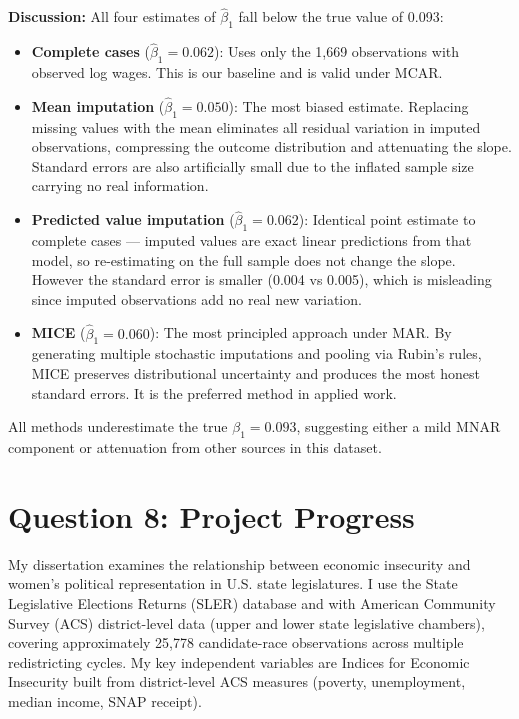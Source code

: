 \documentclass[12pt]{article}
\begin{document}
\noindent\textbf{Discussion:} All four estimates of $\hat{\beta}_1$ fall below the true value of 0.093:

\begin{itemize}
  \item \textbf{Complete cases} ($\hat{\beta}_1 = 0.062$): Uses only the 1,669 observations with observed log wages. This is our baseline and is valid under MCAR.
  \item \textbf{Mean imputation} ($\hat{\beta}_1 = 0.050$): The most biased estimate. Replacing missing values with the mean eliminates all residual variation in imputed observations, compressing the outcome distribution and attenuating the slope. Standard errors are also artificially small due to the inflated sample size carrying no real information.
  \item \textbf{Predicted value imputation} ($\hat{\beta}_1 = 0.062$): Identical point estimate to complete cases --- imputed values are exact linear predictions from that model, so re-estimating on the full sample does not change the slope. However the standard error is smaller (0.004 vs 0.005), which is misleading since imputed observations add no real new variation.
  \item \textbf{MICE} ($\hat{\beta}_1 = 0.060$): The most principled approach under MAR. By generating multiple stochastic imputations and pooling via Rubin's rules, MICE preserves distributional uncertainty and produces the most honest standard errors. It is the preferred method in applied work.
\end{itemize}

All methods underestimate the true $\beta_1 = 0.093$, suggesting either a mild MNAR component or attenuation from other sources in this dataset.

\section*{Question 8: Project Progress}

My dissertation examines the relationship between economic insecurity and women's political representation in U.S. state legislatures. I use the State Legislative Elections Returns (SLER) database and with American Community Survey (ACS) district-level data (upper and lower state legislative chambers), covering approximately 25,778 candidate-race observations across multiple redistricting cycles. My key independent variables are Indices for Economic Insecurity built from district-level ACS measures (poverty, unemployment, median income, SNAP receipt).
\end{document}

